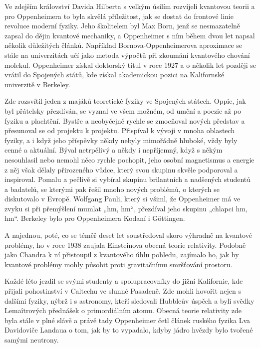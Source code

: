   Ve zdejším království Davida Hilberta s velkým úsilím rozvíjeli kvantovou teorii a pro
  Oppenheimera to byla skvělá příležitost, jak se dostat do frontové linie revoluce moderní fyziky.
  Jeho školitelem byl Max Born, jenž se nesmazatelně zapsal do dějin kvantové mechaniky, a
  Oppenheimer s ním během dvou let napsal několik důležitých článků. Například
  Bornova-Oppenheimerova aproximace se stále na univerzitách učí jako metoda výpočtů při zkoumání
  kvantového chování molekul. Oppenheimer získal doktorský titul v roce 1927 a o několik let později
  se vrátil do Spojených států, kde získal akademickou pozici na Kalifornské univerzitě v Berkeley.
  
  Zde rozsvítil jeden z majáků teoretické fyziky ve Spojených státech. Oppie, jak byl přátelsky
  přezdíván, se vyznal ve všem možném, od umění a poezie až po fyziku a plachtění. Bystře a
  neobyčejně rychle se zmocňoval nových představ a přesunoval se od projektu k projektu. Přispíval k
  vývoji v mnoha oblastech fyziky, a i když jeho příspěvky někdy nebyly mimořádně hluboké, vždy byly
  cenné a aktuální. Býval netrpělivý a někdy i nepříjemný, když s někým nesouhlasil nebo nemohl něco
  rychle pochopit, jeho osobní magnetismus a energie z něj však dělaly přirozeného vůdce, který svou
  skupinu skvěle podporoval a inspiroval. Pomalu a pečlivě si vybíral skupinu brilantních a
  nadšených studentů a badatelů, se kterými pak řešil mnoho nových problémů, o kterých se
  diskutovalo v Evropě. Wolfgang Pauli, který si všiml, že Oppenheimer má ve zvyku si při přemýšlení
  mumlat „hm, hm“, přezdíval jeho skupinu „chlapci hm, hm“. Berkeley bylo pro Oppenheimera Kodaní i
  Göttingen. 
  
  A najednou, poté, co se téměř deset let soustřeďoval skoro výhradně na kvantové problémy, ho v
  roce 1938 zaujala Einsteinova obecná teorie relativity. Podobně jako Chandra k ní přistoupil z
  kvantového úhlu pohledu, zajímalo ho, jak by kvantové problémy mohly působit proti gravitačnímu
  smršťování prostoru. 
  
  Každé léto jezdil se svými studenty a spolupracovníky do jižní Kalifornie, kde přijali
  pohostinství v Caltechu ve slunné Pasadeně. Zde mohli hovořit nejen s dalšími fyziky, nýbrž i s
  astronomy, kteří sledovali Hubbleův úspěch a byli svědky Lemaîtrových přednášek o primordiálním
  atomu. Obecná teorie relativity zde byla stále v plné slávě a právě tady Oppenheimer četl článek
  ruského fyzika Lva Davidoviče Landaua o tom, jak by to vypadalo, kdyby jádro hvězdy bylo tvořené
  samými neutrony. 
  

